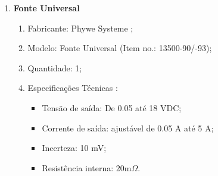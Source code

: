 \documentclass[reprint,amsmath,amssymb,aps]{revtex4-2}
\begin{document}
\begin{enumerate}
   \item \textbf{Fonte Universal}
    \begin{enumerate}
        \item Fabricante: Phywe Systeme \textregistered;
        \item Modelo: Fonte Universal (Item no.: 13500-90/-93); 
        \item Quantidade: 1;
        \item Especificações Técnicas \cite{fonteuniversal}:
        \begin{itemize}
            \item Tensão de saída: De 0.05 até 18 VDC;
            \item Corrente de saída: ajustável de 0.05 A até 5 A;
            \item Incerteza: 10 mV;
            \item Resistência interna: $20 \text{m}\Omega$.
        \end{itemize}
    \end{enumerate}
    


\end{enumerate}
\end{document}
